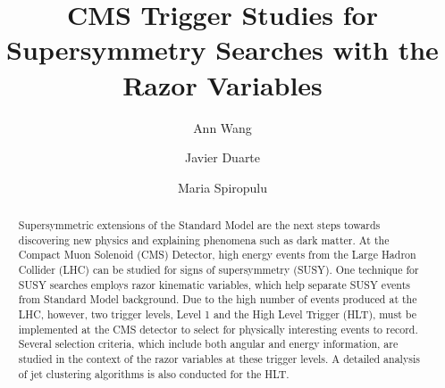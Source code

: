 \documentclass[twocolumn,aps,prd,reprint]{revtex4-1}
\begin{document}
\graphicspath{{AnnWang/}}

\title{	CMS Trigger Studies for Supersymmetry Searches with the Razor Variables}
\author{Ann Wang}
\author{Javier Duarte}
\author{Maria Spiropulu}

\begin{abstract}
Supersymmetric extensions of the Standard Model are the next steps towards discovering new physics and explaining phenomena such as dark matter. At the Compact Muon Solenoid (CMS) Detector, high energy events from the Large Hadron Collider (LHC) can be studied for signs of supersymmetry (SUSY). One technique for SUSY searches employs razor kinematic variables, which help separate SUSY events from Standard Model background. Due to the high number of events produced at the LHC, however, two trigger levels, Level 1 and the High Level Trigger (HLT), must be implemented at the CMS detector to select for physically interesting events to record. Several selection criteria, which include both angular and energy information, are studied in the context of the razor variables at these trigger levels. A detailed analysis of jet clustering algorithms is also conducted for the HLT.
\end{abstract}
\maketitle
\end{document}
